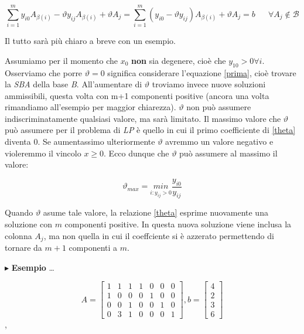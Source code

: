 \documentclass[11pt]{book}
\begin{document}
\begin{center}
\begin{equation}
\sum\limits_{i=1}^m y_{i0} A_{\beta(i)} - \vartheta y_{ij} A_{\beta(i)} +
  \vartheta A_j = \sum\limits_{i=1}^m (y_{i0} - \vartheta y_{ij})
  A_{\beta(i)} + \vartheta A_j = b\phantom{aaa}\forall A_j \not\in
  \mathcal{B}
\label{theta}
\end{equation}
\end{center}

Il tutto sar\`a pi\`u chiaro a breve con un esempio.

Assumiamo per il momento che $x_0$ {\bf non} sia degenere, cio\`e che
$y_{10} > 0 \forall i$. Osserviamo che porre $\vartheta = 0$ significa
considerare l'equazione \ref{prima}, cio\`e trovare la {\em SBA} della
base {\em B}. All'aumentare di $\vartheta$ troviamo invece nuove
soluzioni ammissibili, questa volta con m+1 componenti positive
(ancora una volta rimandiamo all'esempio per maggior
chiarezza). $\vartheta$ non pu\`o assumere indiscriminatamente
qualsiasi valore, ma sar\`a limitato. Il massimo valore che
$\vartheta$ pu\`o assumere per il problema di {\em LP} \`e quello in
cui il primo coefficiente di \ref{theta} diventa 0. Se aumentassimo
ulteriormente $\vartheta$ avremmo un valore negativo e violeremmo il
vincolo $x \geq 0$. Ecco dunque che $\vartheta$ pu\`o assumere al
massimo il valore:

\begin{center}
\begin{equation}
\vartheta_{max} = \underset{i:y_{ij}>0}{min} \frac{y_{i0}}{y_{ij}}
\label{thetamax}
\end{equation}
\end{center}

Quando $\vartheta$ asume tale valore, la relazione \ref{theta} esprime
nuovamente una soluzione con $m$ componenti positive. In questa nuova
soluzione viene inclusa la colonna $A_j$, ma non quella in cui il
coeffciente si \`e azzerato permettendo di tornare da $m+1$ componenti
a $m$.\newline\vspace{11pt}

$\blacktriangleright$ {\bf Esempio} \dots

\begin{center}
\[
A = 
\begin{bmatrix}
1 & 1 & 1 & 1 & 0 & 0 & 0 \\
1 & 0 & 0 & 0 & 1 & 0 & 0 \\
0 & 0 & 1 & 0 & 0 & 1 & 0 \\
0 & 3 & 1 & 0 & 0 & 0 & 1
\end{bmatrix},
b = 
\begin{bmatrix}
4 \\ 2 \\ 3 \\ 6
\end{bmatrix}
\],
\end{center}
\end{document}
